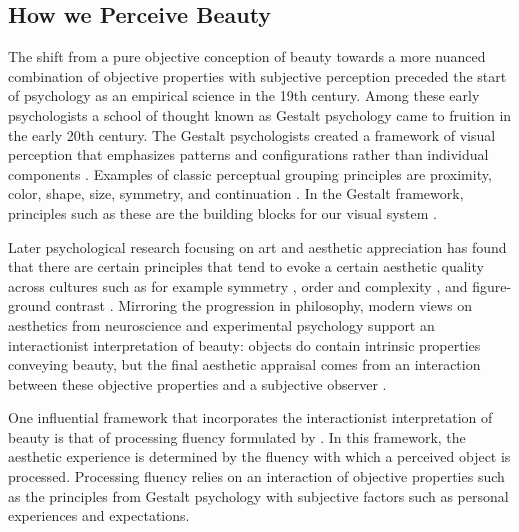 \documentclass[../main.tex]{subfiles}
\begin{document}
\subsection{How we Perceive Beauty}
The shift from a pure objective conception of beauty towards a more nuanced combination of objective properties with subjective perception preceded the start of psychology as an empirical science in the 19th century. Among these early psychologists a school of thought known as Gestalt psychology came to fruition in the early 20th century. The Gestalt psychologists created a framework of visual perception that emphasizes patterns and configurations rather than individual components \parencite{wagemansCenturyGestaltPsychology2012a}. Examples of classic perceptual grouping principles are proximity, color, shape, size, symmetry, and continuation \parencite{wertheimer1923laws, brooks2015traditional}. In the Gestalt framework, principles such as these are the building blocks for our visual system \parencite{wagemansCenturyGestaltPsychology2012a}.

Later psychological research focusing on art and aesthetic appreciation has found that there are  certain principles that tend to evoke a certain aesthetic quality across cultures such as for example symmetry \parencite{bodeCrossculturalComparisonPreference2017}, order and complexity \parencite{van2021order}, and figure-ground contrast \parencite{reberProcessingFluencyAesthetic2004}. Mirroring the progression in philosophy, modern views on aesthetics from neuroscience and experimental psychology support an interactionist interpretation of beauty: objects do contain intrinsic properties conveying beauty, but the final aesthetic appraisal comes from an interaction between these objective properties and a subjective observer \parencite{valenziseAdvancesChallengesComputational2022}.

One influential framework that incorporates the interactionist interpretation of beauty is that of processing fluency formulated by \textcite{reberProcessingFluencyAesthetic2004}. In this framework, the aesthetic experience is determined by the fluency with which a perceived object is processed. Processing fluency relies on an interaction of objective properties such as the principles from Gestalt psychology with subjective factors such as personal experiences and expectations.

\end{document}
